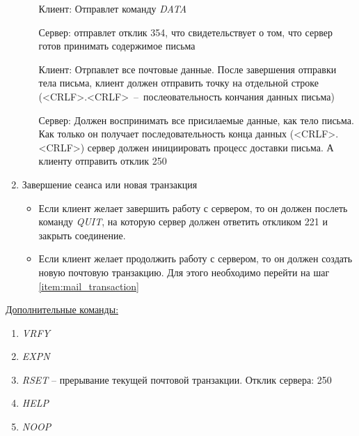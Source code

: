 \documentclass[a4paper,12pt]{report}
\begin{document}
\begin{enumerate}
\begin{enumerate}
	         Клиент: Отправлет команду \textit{DATA} 
	         
	         Сервер: отправлет отклик 354, что свидетельствует о том, что сервер готов принимать содержимое письма
	         
	         Клиент: Отрпавлет все почтовые данные. После завершения отправки тела письма, клиент должен отправить точку на отдельной строке (<CRLF>.<CRLF>~--~послеовательность кончания данных письма)
	         
	         Сервер: Должен воспринимать все присилаемые данные, как тело письма. Как только он получает последовательность конца данных (<CRLF>.<CRLF>) сервер должен инициировать процесс доставки письма. А клиенту отправить отклик 250
	     \end{enumerate}
	     
	     \item Завершение сеанса или новая транзакция
	     \begin{itemize}
	         \item Если клиент желает завершить работу с сервером, то он должен послеть команду \textit{QUIT}, на которую сервер должен ответить откликом 221 и закрыть соединение.
	         \item Если клиент желает продолжить работу с сервером, то он должен создать новую почтовую транзакцию. Для этого необходимо перейти на шаг \ref{item:mail_transaction}
	     \end{itemize}
	 \end{enumerate}
	 
	 \underline{Дополнительные команды:}
	 \begin{enumerate}
	     \item \textit{VRFY}
	     \item \textit{EXPN}
	     \item \textit{RSET} -- прерывание текущей почтовой транзакции. Отклик сервера: 250
	     \item \textit{HELP}
	     \item \textit{NOOP}
	 \end{enumerate}
	
\end{document}
